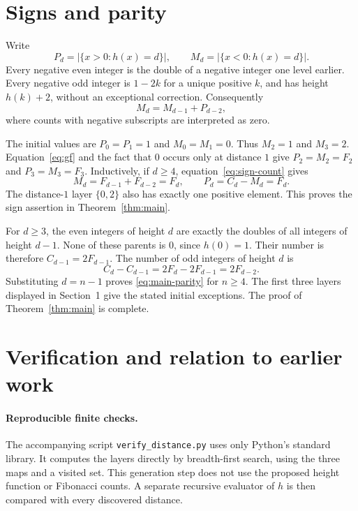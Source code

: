 \documentclass[11pt]{article}
\theoremstyle{remark}
\begin{document}
\section{Signs and parity}

Write
\[
P_d=|\{x>0:h(x)=d\}|,\qquad
M_d=|\{x<0:h(x)=d\}|.
\]
Every negative even integer is the double of a negative integer one
level earlier. Every negative odd integer is $1-2k$ for a unique
positive $k$, and has height $h(k)+2$, without an exceptional correction.
Consequently
\begin{equation}\label{eq:sign-count}
M_d=M_{d-1}+P_{d-2},
\end{equation}
where counts with negative subscripts are interpreted as zero.

The initial values are $P_0=P_1=1$ and $M_0=M_1=0$.
Thus $M_2=1$ and $M_3=2$. Equation~\eqref{eq:gf} and the fact that
$0$ occurs only at distance $1$ give
$P_2=M_2=F_2$ and $P_3=M_3=F_3$. Inductively, if $d\ge4$,
equation~\eqref{eq:sign-count} gives
\[
M_d=F_{d-1}+F_{d-2}=F_d,
\qquad P_d=C_d-M_d=F_d.
\]
The distance-$1$ layer $\{0,2\}$ also has exactly one positive element.
This proves the sign assertion in Theorem~\ref{thm:main}.

For $d\ge3$, the even integers of height $d$ are exactly the doubles
of all integers of height $d-1$. None of these parents is $0$, since
$h(0)=1$. Their number is therefore $C_{d-1}=2F_{d-1}$.
The number of odd integers of height $d$ is
\[
C_d-C_{d-1}=2F_d-2F_{d-1}=2F_{d-2}.
\]
Substituting $d=n-1$ proves \eqref{eq:main-parity} for $n\ge4$.
The first three layers displayed in Section~1 give the stated initial
exceptions. The proof of Theorem~\ref{thm:main} is complete.

\section{Verification and relation to earlier work}

\paragraph{Reproducible finite checks.}
The accompanying script \texttt{verify\_distance.py} uses only Python's
standard library. It computes the layers directly by breadth-first search,
using the three maps and a visited set. This generation step does not use
the proposed height function or Fibonacci counts. A separate recursive
evaluator of $h$ is then compared with every discovered distance.
\end{document}
